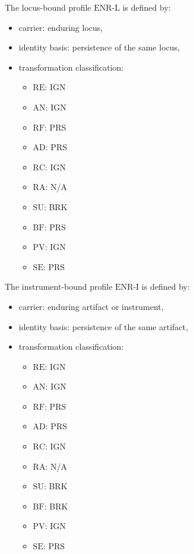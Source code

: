 \begin{definition}
The locus-bound profile $\mathrm{ENR\mbox{-}L}$ is defined by:
\begin{itemize}
\item carrier: enduring locus,
\item identity basis: persistence of the same locus,
\item transformation classification:
\begin{itemize}
\item $\mathrm{RE}$: IGN
\item $\mathrm{AN}$: IGN
\item $\mathrm{RF}$: PRS
\item $\mathrm{AD}$: PRS
\item $\mathrm{RC}$: IGN
\item $\mathrm{RA}$: N/A
\item $\mathrm{SU}$: BRK
\item $\mathrm{BF}$: PRS
\item $\mathrm{PV}$: IGN
\item $\mathrm{SE}$: PRS
\end{itemize}
\end{itemize}
\end{definition}

\begin{definition}
The instrument-bound profile $\mathrm{ENR\mbox{-}I}$ is defined by:
\begin{itemize}
\item carrier: enduring artifact or instrument,
\item identity basis: persistence of the same artifact,
\item transformation classification:
\begin{itemize}
\item $\mathrm{RE}$: IGN
\item $\mathrm{AN}$: IGN
\item $\mathrm{RF}$: PRS
\item $\mathrm{AD}$: PRS
\item $\mathrm{RC}$: IGN
\item $\mathrm{RA}$: N/A
\item $\mathrm{SU}$: BRK
\item $\mathrm{BF}$: BRK
\item $\mathrm{PV}$: IGN
\item $\mathrm{SE}$: PRS
\end{itemize}
\end{itemize}
\end{definition}

